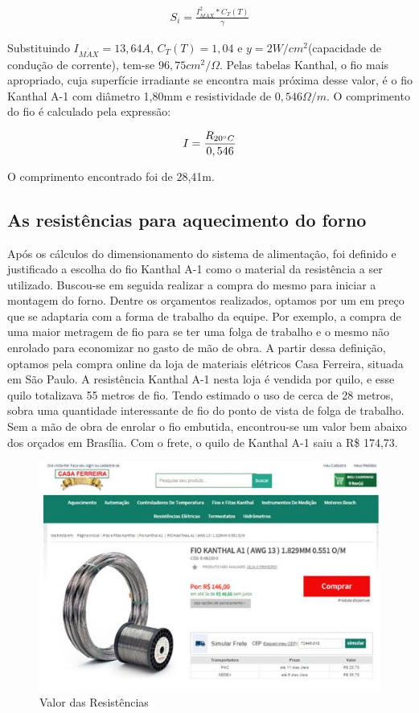 \begin{gather}
    S_i = \frac{I_{M\acute{A}X}^{2}*C_T(T)}{\gamma}
\end{gather}

Substituindo $I_{M\acute{A}X}=13,64A$, $C_T(T)=1,04$ e $y=2W/cm^{2}$(capacidade de condução de corrente), tem-se $96,75 cm^{2} / \Omega$. Pelas tabelas Kanthal, o fio mais apropriado, cuja superfície irradiante se encontra mais próxima desse valor, é o fio Kanthal A-1 com diâmetro 1,80mm e resistividade de $0,546\Omega /m$. O comprimento do fio é calculado pela expressão:

\begin{gather}
    I = \frac{R_{20 \degree C}}{0,546}
\end{gather}

O comprimento encontrado foi de 28,41m.

\subsection{As resistências para aquecimento do forno}

Após os cálculos do dimensionamento do sistema de alimentação, foi definido e justificado a escolha do fio Kanthal A-1 como o material da resistência a ser utilizado.
Buscou-se em seguida realizar a compra do mesmo para iniciar a montagem do forno. Dentre os orçamentos realizados, optamos por um em preço que se adaptaria com a forma de trabalho da equipe. Por exemplo, a compra de uma maior metragem de fio para se ter uma folga de trabalho e o mesmo não enrolado para economizar no gasto de mão de obra.
A partir dessa definição, optamos pela compra online da loja de materiais elétricos Casa Ferreira, situada em São Paulo. A resistência Kanthal A-1 nesta loja é vendida por quilo, e esse quilo totalizava 55 metros de fio. Tendo estimado o uso de cerca de 28 metros, sobra uma quantidade interessante de fio do ponto de vista de folga de trabalho. Sem a mão de obra de enrolar o fio embutida, encontrou-se um valor bem abaixo dos orçados em Brasília. Com o frete, o quilo de Kanthal A-1 saiu a R\$ 174,73.


\begin{figure}[!h]
	\centering
	\label{resistencia1}
	\includegraphics[keepaspectratio=true,scale=1.0]{figuras/alimentacao1.JPG}
	\caption{Valor das Resistências}
\end{figure}

